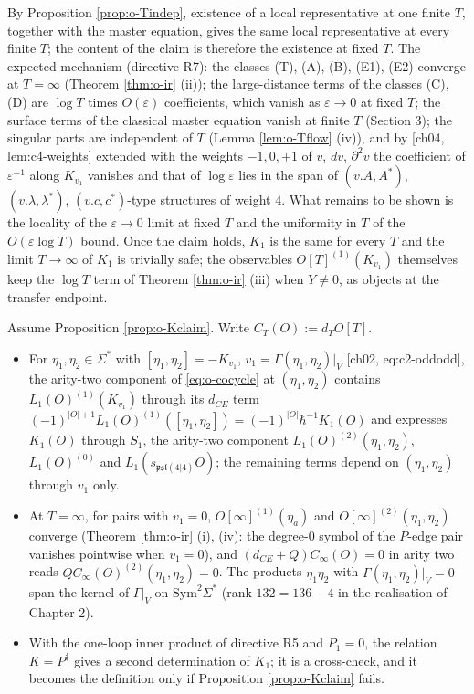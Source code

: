 \begin{remark}
By Proposition \ref{prop:o-Tindep}, existence of a local representative at one finite $T$, together with the master equation, gives the same local representative at every finite $T$; the content of the claim is therefore the existence at fixed $T$. The expected mechanism (directive R7): the classes (T), (A), (B), (E1), (E2) converge at $T=\infty$ (Theorem \ref{thm:o-ir} (ii)); the large-distance terms of the classes (C), (D) are $\log T$ times $O(\varepsilon)$ coefficients, which vanish as $\varepsilon\to0$ at fixed $T$; the surface terms of the classical master equation vanish at finite $T$ (Section 3); the singular parts are independent of $T$ (Lemma \ref{lem:o-Tflow} (iv)), and by [ch04, lem:c4-weights] extended with the weights $-1,0,+1$ of $v$, $dv$, $\partial^2v$ the coefficient of $\varepsilon^{-1}$ along $K_{v_1}$ vanishes and that of $\log\varepsilon$ lies in the span of $(v.A,A^*)$, $(v.\lambda,\lambda^*)$, $(v.c,c^*)$-type structures of weight $4$. What remains to be shown is the locality of the $\varepsilon\to0$ limit at fixed $T$ and the uniformity in $T$ of the $O(\varepsilon\log T)$ bound. Once the claim holds, $K_1$ is the same for every $T$ and the limit $T\to\infty$ of $K_1$ is trivially safe; the observables $O[T]^{(1)}(K_{v_1})$ themselves keep the $\log T$ term of Theorem \ref{thm:o-ir} (iii) when $Y\neq0$, as objects at the transfer endpoint.
\end{remark}

\begin{proposition}
\label{prop:o-Kconsistent}
Assume Proposition \ref{prop:o-Kclaim}. Write $C_T(O):=d_TO[T]$.
\begin{itemize}
\item[(i)] For $\eta_1,\eta_2\in\Sigma^*$ with $[\eta_1,\eta_2]=-K_{v_1}$, $v_1=\Gamma(\eta_1,\eta_2)|_V$ [ch02, eq:c2-oddodd], the arity-two component of \eqref{eq:o-cocycle} at $(\eta_1,\eta_2)$ contains $L_1(O)^{(1)}(K_{v_1})$ through its $d_{CE}$ term $(-1)^{|O|+1}L_1(O)^{(1)}([\eta_1,\eta_2])=(-1)^{|O|}\hbar^{-1}K_1(O)$ and expresses $K_1(O)$ through $S_1$, the arity-two component $L_1(O)^{(2)}(\eta_1,\eta_2)$, $L_1(O)^{(0)}$ and $L_1(s_{\mathfrak{psl}(4|4)}O)$; the remaining terms depend on $(\eta_1,\eta_2)$ through $v_1$ only.
\item[(ii)] At $T=\infty$, for pairs with $v_1=0$, $O[\infty]^{(1)}(\eta_a)$ and $O[\infty]^{(2)}(\eta_1,\eta_2)$ converge (Theorem \ref{thm:o-ir} (i), (iv): the degree-$0$ symbol of the $P$-edge pair vanishes pointwise when $v_1=0$), and $(d_{CE}+Q)C_\infty(O)=0$ in arity two reads $QC_\infty(O)^{(2)}(\eta_1,\eta_2)=0$. The products $\eta_1\eta_2$ with $\Gamma(\eta_1,\eta_2)|_V=0$ span the kernel of $\Gamma|_V$ on $\mathrm{Sym}^2\Sigma^*$ (rank $132=136-4$ in the realisation of Chapter 2).
\item[(iii)] With the one-loop inner product of directive R5 and $P_1=0$, the relation $K=P^\dagger$ gives a second determination of $K_1$; it is a cross-check, and it becomes the definition only if Proposition \ref{prop:o-Kclaim} fails.
\end{itemize}
\end{proposition}

